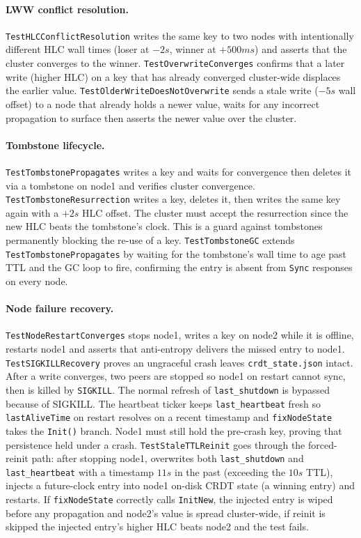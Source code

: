 \documentclass[conference]{IEEEtran}
\begin{document}
\paragraph{LWW conflict resolution.}
\texttt{TestHLCConflictResolution} writes the same key to two nodes with
intentionally different HLC wall times (loser at $-2s$, winner at
$+500ms$) and asserts that the cluster converges to the winner.
\texttt{TestOverwriteConverges} confirms that a later write (higher HLC) on a
key that has already converged cluster-wide displaces the earlier value.
\texttt{TestOlderWriteDoesNotOverwrite} sends a stale write ($-5s$
wall offset) to a node that already holds a newer value, waits for any
incorrect propagation to surface then asserts the newer value over the cluster.

\paragraph{Tombstone lifecycle.}
\texttt{TestTombstonePropagates} writes a key and waits for convergence then deletes it via a tombstone on node1
and verifies cluster convergence.
\texttt{TestTombstoneResurrection} writes a key, deletes it, then writes the
same key again with a $+2s$ HLC offset. The cluster must accept the
resurrection since the new HLC beats the tombstone's clock. This is a guard
against tombstones permanently blocking the re-use of a key.
\texttt{TestTombstoneGC} extends \texttt{TestTombstonePropagates} by waiting
for the tombstone's wall time to age past TTL and the GC loop to fire,
confirming the entry is absent from \texttt{Sync} responses on every node.

\paragraph{Node failure recovery.}
\texttt{TestNodeRestartConverges} stops node1, writes a key on node2 while
it is offline, restarts node1 and asserts that anti-entropy delivers the
missed entry to node1.
\texttt{TestSIGKILLRecovery} proves an ungraceful crash leaves
\texttt{crdt\_state.json} intact. After a write converges, two peers are
stopped so node1 on restart cannot sync, then is killed by
\texttt{SIGKILL}. The normal refresh of \texttt{last\_shutdown} is bypassed
because of SIGKILL. The heartbeat ticker keeps \texttt{last\_heartbeat} fresh
so \texttt{lastAliveTime} on restart resolves on a recent timestamp and
\texttt{fixNodeState} takes the \texttt{Init()} branch. Node1 must still hold
the pre-crash key, proving that persistence held under a crash.
\texttt{TestStaleTTLReinit} goes through the forced-reinit path: after stopping
node1, overwrites both \texttt{last\_shutdown} and \texttt{last\_heartbeat}
with a timestamp $11s$ in the past (exceeding the $10s$ TTL), injects
a future-clock entry into node1 on-disk CRDT state (a winning entry) and
restarts. If \texttt{fixNodeState} correctly calls \texttt{InitNew}, the
injected entry is wiped before any propagation and node2's value is spread
cluster-wide, if reinit is skipped the injected entry's higher HLC beats
node2 and the test fails.
\end{document}
